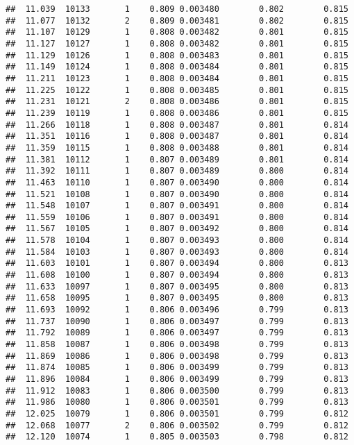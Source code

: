 \documentclass[
]{book}
\begin{document}
\begin{verbatim}
##  11.039  10133       1    0.809 0.003480        0.802        0.815
##  11.077  10132       2    0.809 0.003481        0.802        0.815
##  11.107  10129       1    0.808 0.003482        0.801        0.815
##  11.127  10127       1    0.808 0.003482        0.801        0.815
##  11.129  10126       1    0.808 0.003483        0.801        0.815
##  11.149  10124       1    0.808 0.003484        0.801        0.815
##  11.211  10123       1    0.808 0.003484        0.801        0.815
##  11.225  10122       1    0.808 0.003485        0.801        0.815
##  11.231  10121       2    0.808 0.003486        0.801        0.815
##  11.239  10119       1    0.808 0.003486        0.801        0.815
##  11.266  10118       1    0.808 0.003487        0.801        0.814
##  11.351  10116       1    0.808 0.003487        0.801        0.814
##  11.359  10115       1    0.808 0.003488        0.801        0.814
##  11.381  10112       1    0.807 0.003489        0.801        0.814
##  11.392  10111       1    0.807 0.003489        0.800        0.814
##  11.463  10110       1    0.807 0.003490        0.800        0.814
##  11.521  10108       1    0.807 0.003490        0.800        0.814
##  11.548  10107       1    0.807 0.003491        0.800        0.814
##  11.559  10106       1    0.807 0.003491        0.800        0.814
##  11.567  10105       1    0.807 0.003492        0.800        0.814
##  11.578  10104       1    0.807 0.003493        0.800        0.814
##  11.584  10103       1    0.807 0.003493        0.800        0.814
##  11.603  10101       1    0.807 0.003494        0.800        0.813
##  11.608  10100       1    0.807 0.003494        0.800        0.813
##  11.633  10097       1    0.807 0.003495        0.800        0.813
##  11.658  10095       1    0.807 0.003495        0.800        0.813
##  11.693  10092       1    0.806 0.003496        0.799        0.813
##  11.737  10090       1    0.806 0.003497        0.799        0.813
##  11.792  10089       1    0.806 0.003497        0.799        0.813
##  11.858  10087       1    0.806 0.003498        0.799        0.813
##  11.869  10086       1    0.806 0.003498        0.799        0.813
##  11.874  10085       1    0.806 0.003499        0.799        0.813
##  11.896  10084       1    0.806 0.003499        0.799        0.813
##  11.912  10083       1    0.806 0.003500        0.799        0.813
##  11.986  10080       1    0.806 0.003501        0.799        0.813
##  12.025  10079       1    0.806 0.003501        0.799        0.812
##  12.068  10077       2    0.806 0.003502        0.799        0.812
##  12.120  10074       1    0.805 0.003503        0.798        0.812

\end{verbatim}
\end{document}
